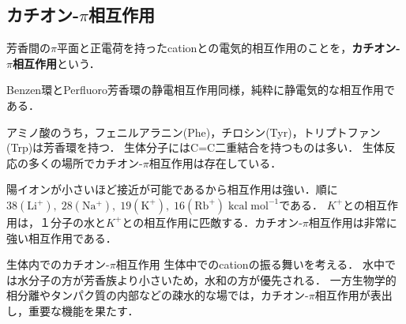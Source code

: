 \documentclass[uplatex, dvipdfmx]{jsreport}
\begin{document}
\subsection{カチオン-$\pi$相互作用}
\begin{definition}
    芳香間の$\pi$平面と正電荷を持ったcationとの電気的相互作用のことを，\textbf{カチオン-$\pi$相互作用}という．
    
    Benzen環とPerfluoro芳香環の静電相互作用同様，純粋に静電気的な相互作用である．
\end{definition}
\begin{example}[生体での普遍性]
    アミノ酸のうち，フェニルアラニン(Phe)，チロシン(Tyr)，トリプトファン(Trp)は芳香環を持つ．
    生体分子にはC=C二重結合を持つものは多い．
    生体反応の多くの場所でカチオン-$\pi$相互作用は存在している．
\end{example}
\begin{example}
    陽イオンが小さいほど接近が可能であるから相互作用は強い．順に$\mathrm{38(Li^+),\; 28(Na^+),\; 19(K^+),\;16(Rb^+)\;kcal\;mol^{-1}}$である．
    $K^+$との相互作用は，１分子の水と$K^+$との相互作用に匹敵する．カチオン-$\pi$相互作用は非常に強い相互作用である．
\end{example}

\begin{itembox}[l]{生体内でのカチオン-$\pi$相互作用}
    生体中でのcationの振る舞いを考える．
    水中では水分子の方が芳香族より小さいため，水和の方が優先される．
    一方生物学的相分離やタンパク質の内部などの疎水的な場では，カチオン-$\pi$相互作用が表出し，重要な機能を果たす．
\end{itembox}
\end{document}
